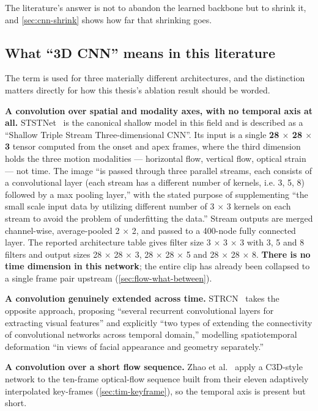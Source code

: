 The literature's answer is not to abandon the learned backbone but to shrink it, and \autoref{sec:cnn-shrink} shows how far that shrinking goes.

\subsection{What ``3D CNN'' means in this literature}
\label{sec:cnn-meaning}

The term is used for three materially different architectures, and the distinction matters directly for how this thesis's ablation result should be worded.

\textbf{A convolution over spatial and modality axes, with no temporal axis at all.} STSTNet~\cite{liong2019b} is the canonical shallow model in this field and is described as a ``Shallow Triple Stream Three-dimensional CNN''. Its input is a single \textbf{28 $\times$ 28 $\times$ 3} tensor computed from the onset and apex frames, where the third dimension holds the three motion modalities --- horizontal flow, vertical flow, optical strain --- not time. The image ``is passed through three parallel streams, each consists of a convolutional layer (each stream has a different number of kernels, i.e. 3, 5, 8) followed by a max pooling layer,'' with the stated purpose of supplementing ``the small scale input data by utilizing different number of 3 $\times$ 3 kernels on each stream to avoid the problem of underfitting the data.'' Stream outputs are merged channel-wise, average-pooled 2 $\times$ 2, and passed to a 400-node fully connected layer. The reported architecture table gives filter size 3 $\times$ 3 $\times$ 3 with 3, 5 and 8 filters and output sizes 28 $\times$ 28 $\times$ 3, 28 $\times$ 28 $\times$ 5 and 28 $\times$ 28 $\times$ 8. \textbf{There is no time dimension in this network}; the entire clip has already been collapsed to a single frame pair upstream (\autoref{sec:flow-what-between}).

\textbf{A convolution genuinely extended across time.} STRCN~\cite{xia2020a} takes the opposite approach, proposing ``several recurrent convolutional layers for extracting visual features'' and explicitly ``two types of extending the connectivity of convolutional networks across temporal domain,'' modelling spatiotemporal deformation ``in views of facial appearance and geometry separately.''

\textbf{A convolution over a short flow sequence.} Zhao et al.~\cite{zhaoS2021} apply a C3D-style network to the ten-frame optical-flow sequence built from their eleven adaptively interpolated key-frames (\autoref{sec:tim-keyframe}), so the temporal axis is present but short.

